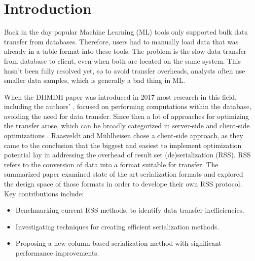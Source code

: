 \documentclass[sigconf]{acmart}
\begin{document}


\maketitle

\section{Introduction}
Back in the day popular Machine Learning (ML) tools only supported bulk data transfer from databases. Therefore, users had to manually load data that was already in a table format into these tools. The problem is the slow data transfer from database to client, even when both are located on the same system. This hasn't been fully resolved yet, so to avoid transfer overheads, analysts often use smaller data samples, which is generally a bad thing in ML.

When the DHMDH \cite{raasveldt2017dhmds} paper was introduced in 2017 most research in this field, including the authors' \cite{raasveldt2016vectorized}, focused on performing computations within the database, avoiding the need for data transfer. Since then a lot of approaches for optimizing the transfer arose, which can be broadly categorized in server-side and client-side optimizations \cite{wang2022connectorx}. Raasveldt and Mühlheisen chose a client-side approach, as they came to the conclusion that the biggest and easiest to implement optimization potential lay in addressing the overhead of result set (de)serialization (RSS). RSS refers to the conversion of data into a format suitable for transfer.
The summarized paper examined state of the art serialization formats and explored the design space of those formats in order to develope their own RSS protocol.
Key contributions include:
\begin{itemize}
  \item Benchmarking current RSS methods, to identify data transfer inefficiencies.
  \item Investigating techniques for creating efficient serialization methods.
  \item Proposing a new column-based serialization method with significant performance improvements.
\end{itemize}
\end{document}
